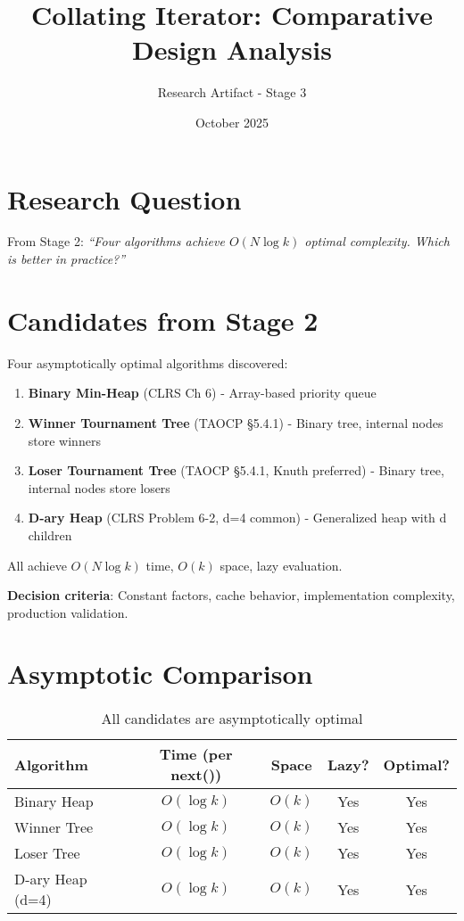 \documentclass[11pt]{article}
\title{Collating Iterator: Comparative Design Analysis}
\author{Research Artifact - Stage 3}
\date{October 2025}
\begin{document}
\maketitle

\section{Research Question}

From Stage 2: \textit{``Four algorithms achieve $O(N \log k)$ optimal complexity. Which is better in practice?''}

\section{Candidates from Stage 2}

Four asymptotically optimal algorithms discovered:

\begin{enumerate}
    \item \textbf{Binary Min-Heap} (CLRS Ch 6) - Array-based priority queue
    \item \textbf{Winner Tournament Tree} (TAOCP §5.4.1) - Binary tree, internal nodes store winners
    \item \textbf{Loser Tournament Tree} (TAOCP §5.4.1, Knuth preferred) - Binary tree, internal nodes store losers
    \item \textbf{D-ary Heap} (CLRS Problem 6-2, d=4 common) - Generalized heap with d children
\end{enumerate}

All achieve $O(N \log k)$ time, $O(k)$ space, lazy evaluation.

\textbf{Decision criteria}: Constant factors, cache behavior, implementation complexity, production validation.

\section{Asymptotic Comparison}

\begin{table}[h]
\centering
\begin{tabular}{lcccc}
\toprule
\textbf{Algorithm} & \textbf{Time (per next())} & \textbf{Space} & \textbf{Lazy?} & \textbf{Optimal?} \\
\midrule
Binary Heap & $O(\log k)$ & $O(k)$ & Yes & Yes \\
Winner Tree & $O(\log k)$ & $O(k)$ & Yes & Yes \\
Loser Tree & $O(\log k)$ & $O(k)$ & Yes & Yes \\
D-ary Heap (d=4) & $O(\log k)$ & $O(k)$ & Yes & Yes \\
\bottomrule
\end{tabular}
\caption{All candidates are asymptotically optimal}
\end{table}
\end{document}

